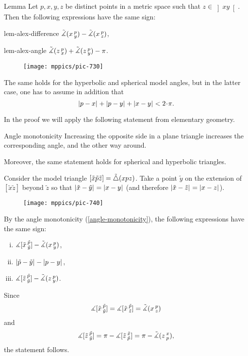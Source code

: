\begin{thm}{Lemma}
\label{lem:alex}  
Let $p,x,y,z$ be distinct points in a metric space such that $z\in \left]x y\right[$.
Then 
the following expressions have the same sign:

\begin{subthm}{lem-alex-difference}
$\tilde\measuredangle(x\,{}^{p}_{y})
-\tilde\measuredangle(x\,{}^{p}_{z})$,
\end{subthm} 

\begin{subthm}{lem-alex-angle}
$\tilde\measuredangle(z\,{}^{p}_{x})
+\tilde\measuredangle(z\,{}^{p}_{y}) -\pi$.
\end{subthm}

\begin{wrapfigure}{r}{25mm}
\vskip-6mm
\centering
\texttt{[image: mppics/pic-730]}
\end{wrapfigure}

The same holds for the hyperbolic and spherical model angles, 
but in the latter case, one has to assume in addition that
\[\dist{p}{x}{}+\dist{p}{y}{}+\dist{x}{y}{}< 2\cdot\pi.\]

\end{thm}

In the proof we will apply the following statement from elementary geometry.

\begin{thm}{Angle monotonicity}\label{angle-monotonicity}
Increasing the opposite side in a plane triangle increases the corresponding angle, and the other way around.

Moreover, the same statement holds for spherical and hyperbolic triangles.
\end{thm}


Consider the model triangle $[\tilde x\tilde p\tilde z]=\tilde\triangle(x p z)$.
Take 
a point $\tilde y$ on the extension of 
$[\tilde x \tilde z]$ beyond $\tilde z$ so that $|{\tilde x}-{\tilde y}|_{}^{{}}=|{x}-{y}|_{}^{{}}$ (and therefore $|{\tilde x}-{\tilde z}|_{}^{{}}=|{x}-{z}|_{}^{{}}$). 

\begin{wrapfigure}{r}{33mm}
\vskip-0mm
\centering
\texttt{[image: mppics/pic-740]}
\end{wrapfigure}

By the angle monotonicity (\ref{angle-monotonicity}),
the following expressions have the same sign:
\begin{enumerate}[(i)]
\item $\measuredangle[\tilde x\,{}^{\tilde p}_{\tilde y}]-\tilde\measuredangle(x\,{}^{p}_{y})$,
\item $|{\tilde p}-{\tilde y}|_{}^{{}}-|{p}-{y}|_{}^{{}}$,
\item $\measuredangle[\tilde z\,{}^{\tilde p}_{\tilde y}]-\tilde\measuredangle(z\,{}^{p}_{y})$.
\end{enumerate}
Since 
\[\measuredangle[\tilde x\,{}^{\tilde p}_{\tilde y}]=\measuredangle[\tilde x\,{}^{\tilde p}_{\tilde z}]=\tilde\measuredangle(x\,{}^{p}_{z})\]
and
\[ \measuredangle[\tilde z\,{}^{\tilde p}_{\tilde y}]
=\pi-\measuredangle[\tilde z\,{}^{\tilde x}_{\tilde p}]
=\pi-\tilde\measuredangle(z\,{}^{x}_{p}),\]
the statement follows.


